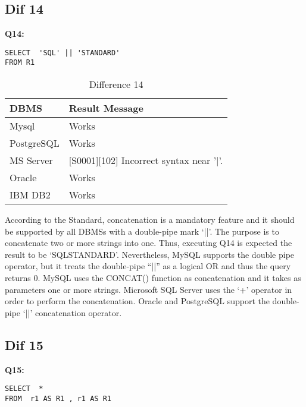 \hfill\newpage
\subsection{Dif 14}

\textbf{Q14:}
\begin{mdframed}[backgroundcolor=lightgray!20]
\begin{lstlisting}[style=SQL]
SELECT  'SQL' || 'STANDARD'
FROM R1
\end{lstlisting}
\end{mdframed}
 
\begin{table}[h]
\centering
\caption{Difference 14}
\label{my-label}
\begin{tabular}{|p{2cm}|p{11.5cm}| }
\hline
\textbf{DBMS} & \textbf{Result Message}                         \\ \hline
Mysql         & Works                                           \\ \hline
PostgreSQL    & Works                                           \\ \hline
MS Server     & {[}S0001{]}{[}102{]} Incorrect syntax near '|'. \\ \hline
Oracle        & Works                                           \\ \hline
IBM DB2       & Works                                           \\ \hline
\end{tabular}
\end{table}

According to the Standard, concatenation is a mandatory feature and it should be supported by all DBMSs with a double-pipe mark ‘||’. The purpose is to concatenate two or more strings into one. Thus, executing Q14 is expected the result to be ‘SQLSTANDARD’. Nevertheless, MySQL supports the double pipe operator, but it treats the double-pipe “||” as a logical OR and thus the query returns 0. MySQL uses the CONCAT() function as concatenation and it takes as parameters one or more strings.   Microsoft SQL Server uses the ‘+’ operator in order to perform the concatenation. Oracle and PostgreSQL support the double-pipe ‘||’ concatenation operator. 




\subsection{Dif 15}
\textbf{Q15:}
\begin{mdframed}[backgroundcolor=lightgray!20]
\begin{lstlisting}[style=SQL]
SELECT  *
FROM  r1 AS R1 , r1 AS R1
\end{lstlisting}
\end{mdframed}

